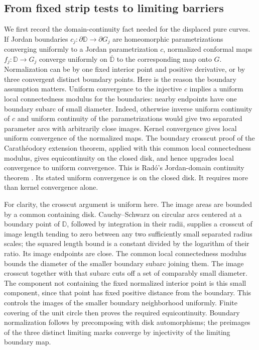 \subsection{From fixed strip tests to limiting barriers}

We first record the domain-continuity fact needed for the displaced pure
curves.  If Jordan boundaries $c_j:\partial\mathbb D\to\partial G_j$
are homeomorphic parametrizations converging uniformly to a Jordan
parametrization $c$, normalized conformal maps
$f_j:\mathbb D\to G_j$ converge uniformly on $\overline{\mathbb D}$
to the corresponding map onto $G$.  Normalization can be by one fixed
interior point and positive derivative, or by three convergent distinct
boundary points.  Here is the reason the boundary assumption matters.
Uniform convergence to the injective $c$ implies a uniform local
connectedness modulus for the boundaries: nearby endpoints have one
boundary subarc of small diameter.  Indeed, otherwise inverse
uniform continuity of $c$ and uniform continuity of the parametrizations
would give two separated parameter arcs with arbitrarily close images.
Kernel convergence gives local uniform convergence of the normalized
maps.  The boundary crosscut proof of the Carath\'eodory extension
theorem, applied with this common local connectedness modulus, gives
equicontinuity on the closed disk, and hence upgrades local convergence
to uniform convergence.  This is Rad\'o's Jordan-domain continuity
theorem \citep[Th\'eor\`eme, p.~182]{Rado1923}.  Its stated uniform
convergence is on the closed disk.  It requires more than kernel
convergence alone.

For clarity, the crosscut argument is uniform here.  The image areas are
bounded by a common containing disk.  Cauchy--Schwarz on circular arcs
centered at a boundary point of $\mathbb D$, followed by integration in
their radii, supplies a crosscut of image length tending to zero between
any two sufficiently small separated radius scales; the squared length
bound is a constant divided by the logarithm of their ratio.  Its image
endpoints are close.  The common local connectedness modulus bounds the
diameter of the smaller boundary subarc joining them.  The image
crosscut together with that subarc cuts off a set of comparably small
diameter.  The component not containing the fixed normalized interior
point is this small component, since that point has fixed positive
distance from the boundary.  This controls the images of the smaller
boundary neighborhood uniformly.  Finite covering of the unit circle
then proves the required equicontinuity.  Boundary normalization follows
by precomposing with disk automorphisms; the preimages of the three
distinct limiting marks converge by injectivity of the limiting boundary
map.

